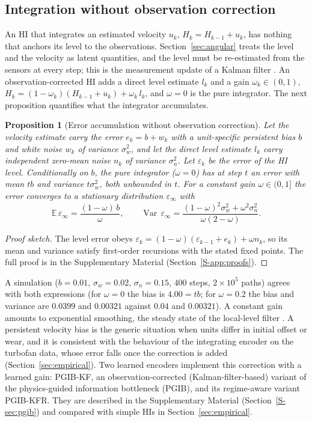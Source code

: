 \documentclass[preprint,12pt]{elsarticle}
\newtheorem{proposition}{Proposition}
\theoremstyle{definition}
\newcommand{\E}{\mathbb{E}}
\DeclareMathOperator{\Var}{Var}
\begin{document}
\subsection{Integration without observation correction}
\label{sec:accum}
An HI that integrates an estimated velocity $u_k$, $H_k=H_{k-1}+u_k$, has nothing that anchors its level to the observations. Section~\ref{sec:angular} treats the level and the velocity as latent quantities, and the level must be re-estimated from the sensors at every step; this is the measurement update of a Kalman filter \cite{kalman1960}. An observation-corrected HI adds a direct level estimate $l_k$ and a gain $\omega_k\in(0,1)$, $H_k=(1-\omega_k)(H_{k-1}+u_k)+\omega_k\,l_k$, and $\omega=0$ is the pure integrator. The next proposition quantifies what the integrator accumulates.

\begin{proposition}[Error accumulation without observation correction]
\label{prop:accum}
Let the velocity estimate carry the error $e_k=b+w_k$ with a unit-specific persistent bias $b$ and white noise $w_k$ of variance $\sigma_w^2$, and let the direct level estimate $l_k$ carry independent zero-mean noise $n_k$ of variance $\sigma_n^2$. Let $\varepsilon_k$ be the error of the HI level. Conditionally on $b$, the pure integrator ($\omega=0$) has at step $t$ an error with mean $tb$ and variance $t\sigma_w^2$, both unbounded in $t$. For a constant gain $\omega\in(0,1]$ the error converges to a stationary distribution $\varepsilon_\infty$ with
\begin{equation}
\E\,\varepsilon_\infty=\frac{(1-\omega)\,b}{\omega},\qquad \Var\,\varepsilon_\infty=\frac{(1-\omega)^2\sigma_w^2+\omega^2\sigma_n^2}{\omega(2-\omega)} .
\end{equation}
\end{proposition}
\begin{proof}[Proof sketch]
The level error obeys $\varepsilon_k=(1-\omega)(\varepsilon_{k-1}+e_k)+\omega n_k$, so its mean and variance satisfy first-order recursions with the stated fixed points. The full proof is in the Supplementary Material (Section~\ref{S-app:proofs}).
\end{proof}
A simulation ($b=0.01$, $\sigma_w=0.02$, $\sigma_n=0.15$, $400$ steps, $2\times10^5$ paths) agrees with both expressions (for $\omega=0$ the bias is $4.00=tb$; for $\omega=0.2$ the bias and variance are $0.0399$ and $0.00321$ against $0.04$ and $0.00321$). A constant gain amounts to exponential smoothing, the steady state of the local-level filter \cite{harvey1989,durbin2012}. A persistent velocity bias is the generic situation when units differ in initial offset or wear, and it is consistent with the behaviour of the integrating encoder on the turbofan data, whose error falls once the correction is added (Section~\ref{sec:empirical}).
Two learned encoders implement this correction with a learned gain: PGIB-KF, an observation-corrected (Kalman-filter-based) variant of the physics-guided information bottleneck (PGIB), and its regime-aware variant PGIB-KFR. They are described in the Supplementary Material (Section~\ref{S-sec:pgib}) and compared with simple HIs in Section~\ref{sec:empirical}.
\end{document}
